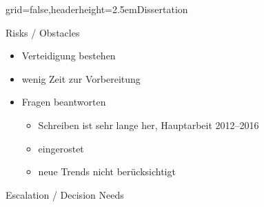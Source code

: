 \documentclass[english]{kiesgrube}
\begin{document}
\begin{poster}{grid=false,headerheight=2.5em}{}{Dissertation}{}{}
\begin{posterbox}[name=risks,column=1,below=description]{Risks / Obstacles}
\begin{itemize}
\item Verteidigung bestehen
\item wenig Zeit zur Vorbereitung
\item Fragen beantworten
\begin{itemize}
 \item Schreiben ist sehr lange her, Hauptarbeit 2012--2016
 \item eingerostet 
 \item neue Trends nicht berücksichtigt
\end{itemize}
\end{itemize}
\end{posterbox}
\begin{posterbox}[name=escalation,column=1,below=risks]{Escalation / Decision Needs}
\end{posterbox}
\footer{}
\end{poster}

\newpage
\end{document}
